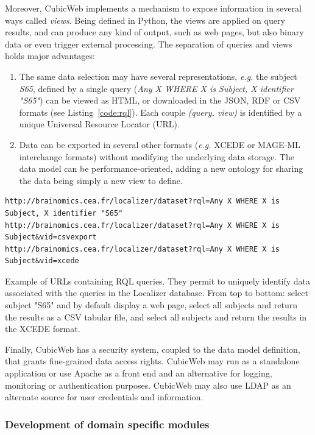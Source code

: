 \documentclass[preprint,12pt]{elsarticle}
\begin{document}
Moreover, CubicWeb implements a mechanism to expose information in several ways called \emph{views}. Being defined in Python, the views are applied on query results, and can produce any kind of output, such as web pages, but also binary data or even trigger external processing. The separation of queries and views holds major advantages:
\begin{enumerate}[label=\roman*)]
\item The same data selection may have several representations, \textit{e.g.} the subject \emph{S65}, defined by a single query (\textit{Any X WHERE X is Subject, X identifier "S65"}) can be viewed as HTML, or downloaded in the JSON, RDF or CSV formats (see Listing~\ref{code:rql}). Each couple \textit{(query, view)} is identified by a unique Universal Resource Locator (URL).
\item Data can be exported in several other formats (\textit{e.g.} XCEDE or MAGE-ML interchange formats) without modifying the underlying data storage. The data model can be performance-oriented, adding a new ontology for sharing the data being simply a new view to define.
\end{enumerate}

\begin{listing}[H]
\begin{verbatim}
http://brainomics.cea.fr/localizer/dataset?rql=Any X WHERE X is Subject, X identifier "S65"
http://brainomics.cea.fr/localizer/dataset?rql=Any X WHERE X is Subject&vid=csvexport
http://brainomics.cea.fr/localizer/dataset?rql=Any X WHERE X is Subject&vid=xcede
\end{verbatim}
\caption{Example of URLs containing RQL queries. They permit to uniquely identify data associated with the queries in the Localizer database. From top to bottom: select subject "S65" and by default display a web page, select all subjects and return the results as a CSV tabular file, and select all subjects and return the results in the XCEDE format.}
\label{code:rql}
\end{listing}

Finally, CubicWeb has a security system, coupled to the data model definition, that grants fine-grained data access rights. CubicWeb may run as a standalone application or use Apache as a front end and an alternative for logging, monitoring or authentication purposes. CubicWeb may also use LDAP as an alternate source for user credentials and information.

\subsubsection{Development of domain specific modules}
\end{document}
